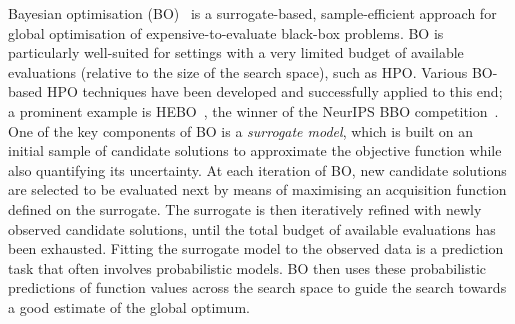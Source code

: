 Bayesian optimisation (BO)~\citep{Mockus12b,Garnett23,Frazier18b,Kushner62,Kushner64} is a surrogate-based, sample-efficient approach for global optimisation of expensive-to-evaluate black-box problems.
BO is particularly well-suited for settings with a very limited budget of available evaluations (relative to the size of the search space), such as HPO.
Various BO-based HPO techniques have been developed and successfully applied to this end; a prominent example is 
HEBO~\citep{CowEtAl22}, the winner of the NeurIPS BBO competition~\citep{TurEtAl20}.
One of the key components of BO is a 
\emph{surrogate model}, which is built on an initial sample of candidate solutions to approximate the objective function while also quantifying its uncertainty.
At each iteration of BO, new candidate solutions are selected to be evaluated next by means of maximising an acquisition function defined on the surrogate.
The surrogate is then iteratively refined with newly observed candidate solutions, until the total budget of available evaluations has been exhausted.
%
Fitting the surrogate model to the observed data is a prediction task that often involves probabilistic models. 
BO then uses these probabilistic predictions of function values across the search space to guide the search towards a good estimate of the global optimum.

